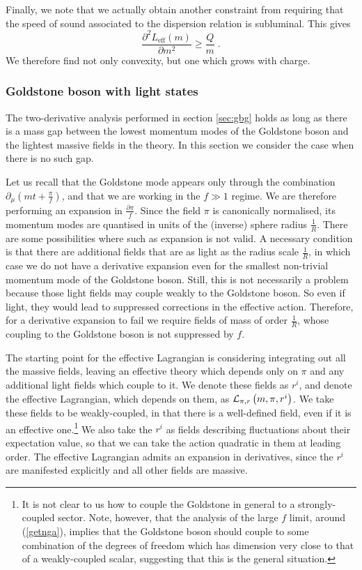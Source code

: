 \documentclass[11pt]{article}
\numberwithin{equation}{section}
\newcommand{\be}{\begin{equation}} \newcommand{\ee}{\end{equation}}
\begin{document}
Finally, we note that we actually obtain another constraint from requiring that the speed of sound associated to the dispersion relation is subluminal. This gives
\be
\frac{\partial^2 L_{\mathrm{eff}}\left(m\right)}{\partial m^2} \geq \frac{Q}{m} \;.
\label{sublum}
\ee
We therefore find not only convexity, but one which grows with charge. 

\subsubsection{Goldstone boson with light states}
\label{sec:gbl}

The two-derivative analysis performed in section \ref{sec:gbg} holds as long as there is a mass gap between the lowest momentum modes of the Goldstone boson and the lightest massive fields in the theory. In this section we consider the case when there is no such gap. 

Let us recall that the Goldstone mode appears only through the combination $\partial_{\mu} \left( m t + \frac{\pi}{f} \right)$, and that we are working in the $f \gg 1$ regime. We are therefore performing an expansion in $\frac{\partial \pi}{f}$. Since the field $\pi$ is canonically normalised, its momentum modes are quantised in units of the (inverse) sphere radius $\frac{1}{R}$. There are some possibilities where such as expansion is not valid. A necessary condition is that there are additional fields that are as light as the radius scale $\frac{1}{R}$, in which case we do not have a derivative expansion even for the smallest non-trivial momentum mode of the Goldstone boson. Still, this is not necessarily a problem because those light fields may couple weakly to the Goldstone boson. So even if light, they would lead to suppressed corrections in the effective action. Therefore, for a derivative expansion to fail we require fields of mass of order $\frac{1}{R}$, whose coupling to the Goldstone boson is not suppressed by $f$. 

The starting point for the effective Lagrangian is considering integrating out all the massive fields, leaving an effective theory which depends only on $\pi$ and any additional light fields which couple to it. We denote these fields as $r^i$, and denote the effective Lagrangian, which depends on them, as ${\cal L}_{\pi,r}\left(m,\pi,r^i\right)$. We take these fields to be weakly-coupled, in that there is a well-defined field, even if it is an effective one.\footnote{It is not clear to us how to couple the Goldstone in general to a strongly-coupled sector. Note, however, that the analysis of the large $f$ limit, around (\ref{getnga}), implies that the Goldstone boson should couple to some combination of the degrees of freedom which has dimension very close to that of a weakly-coupled scalar, suggesting that this is the general situation.} We also take the $r^i$ as fields describing fluctuations about their expectation value, so that we can take the action quadratic in them at leading order. The effective Lagrangian admits an expansion in derivatives, since the $r^i$ are manifested explicitly and all other fields are massive. 
\end{document}
